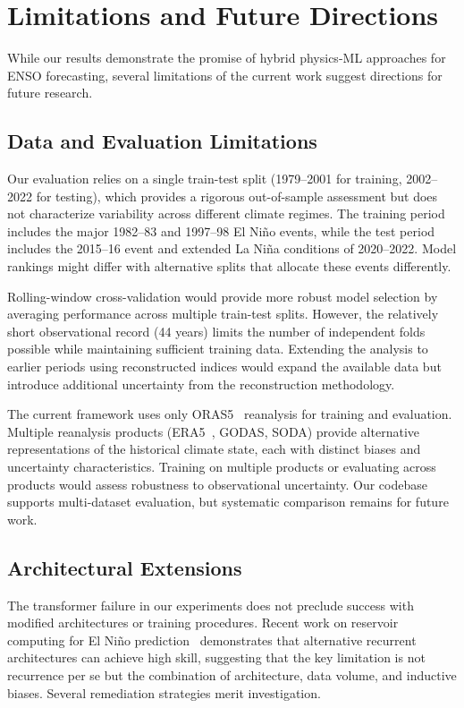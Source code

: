 \section{Limitations and Future Directions}
\label{sec:future}

While our results demonstrate the promise of hybrid physics-ML approaches for ENSO forecasting, several limitations of the current work suggest directions for future research.

\subsection{Data and Evaluation Limitations}

Our evaluation relies on a single train-test split (1979--2001 for training, 2002--2022 for testing), which provides a rigorous out-of-sample assessment but does not characterize variability across different climate regimes. The training period includes the major 1982--83 and 1997--98 El Ni\~no events, while the test period includes the 2015--16 event and extended La Ni\~na conditions of 2020--2022. Model rankings might differ with alternative splits that allocate these events differently.

Rolling-window cross-validation would provide more robust model selection by averaging performance across multiple train-test splits. However, the relatively short observational record (44 years) limits the number of independent folds possible while maintaining sufficient training data. Extending the analysis to earlier periods using reconstructed indices would expand the available data but introduce additional uncertainty from the reconstruction methodology.

The current framework uses only ORAS5~\cite{zuo2019oras5} reanalysis for training and evaluation. Multiple reanalysis products (ERA5~\cite{hersbach2020era5}, GODAS, SODA) provide alternative representations of the historical climate state, each with distinct biases and uncertainty characteristics. Training on multiple products or evaluating across products would assess robustness to observational uncertainty. Our codebase supports multi-dataset evaluation, but systematic comparison remains for future work.

\subsection{Architectural Extensions}

The transformer failure in our experiments does not preclude success with modified architectures or training procedures. Recent work on reservoir computing for El Ni\~no prediction~\cite{guardamagna2025reservoir} demonstrates that alternative recurrent architectures can achieve high skill, suggesting that the key limitation is not recurrence per se but the combination of architecture, data volume, and inductive biases. Several remediation strategies merit investigation.

